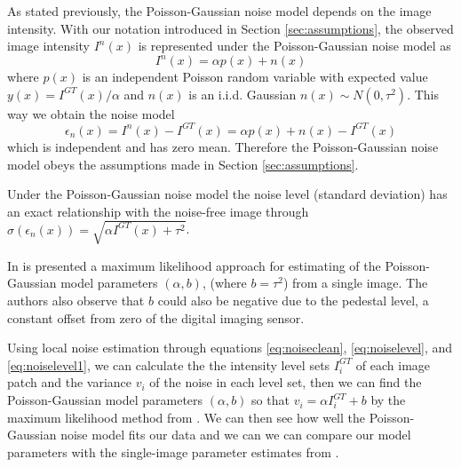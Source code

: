 \documentclass[review]{elsarticle}
\begin{document}
As stated previously, the Poisson-Gaussian noise model \cite{Foi-Poisson,makitalo2014noise} depends on the image intensity. With our notation introduced in Section \ref{sec:assumptions}, the observed image intensity $I^n(x)$ is represented under the Poisson-Gaussian noise model as
\begin{equation}
I^n(x)=\alpha p(x)+n(x)
\end{equation}
where $p(x)$ is an independent Poisson random variable with expected value $y(x)=I^{GT}(x)/\alpha$ and $n(x)$ is an i.i.d. Gaussian $n(x)\sim N(0,\tau^2)$. This way we obtain the noise model
\begin{equation}
\epsilon_n(x)=I^n(x)-I^{GT}(x)=\alpha p(x)+n(x)-I^{GT}(x)
\end{equation}
which is independent and has zero mean. Therefore the Poisson-Gaussian noise model obeys the assumptions made in Section \ref{sec:assumptions}. 

Under the Poisson-Gaussian noise model the noise level (standard deviation) has an exact relationship with the noise-free image through  $\sigma(\epsilon_n(x))=\sqrt{\alpha I^{GT}(x)+\tau^2}$.

In \cite{Foi-Poisson} is presented a maximum likelihood approach for estimating of the Poisson-Gaussian model parameters $(\alpha,b)$, (where $b=\tau^2$) from a single image. The authors also observe that $b$ could also be negative due to the pedestal level, a constant offset from zero of the digital imaging sensor.

Using local noise estimation through equations \eqref{eq:noiseclean}, \eqref{eq:noiselevel}, and \eqref{eq:noiselevel1}, we can calculate the the intensity level sets $I^{GT}_i$ of each image patch and the variance $v_i$ of the noise in each level set, then we can find the Poisson-Gaussian model parameters $(\alpha,b)$ so that $v_i=\alpha I^{GT}_i+b$ by the maximum likelihood method from \cite{Foi-Poisson}. We can then see how well the Poisson-Gaussian noise model fits our data and we can we can compare our model parameters with the single-image parameter estimates from \cite{Foi-Poisson}.
\end{document}
